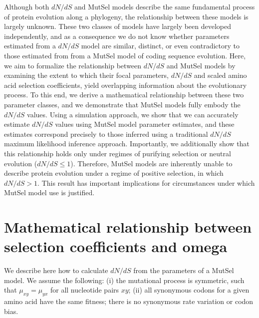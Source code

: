 \documentclass[11pt]{article}
\begin{document}
Although both $dN/dS$ and MutSel models describe the same fundamental process of protein evolution along a phylogeny, the relationship between these models is largely unknown. These two classes of models have largely been developed independently, and as a consequence we do not know whether parameters estimated from a $dN/dS$ model are similar, distinct, or even contradictory to those estimated from from a MutSel model of coding sequence evolution. Here, we aim to formalize the relationship between $dN/dS$ and MutSel models by examining the extent to which their focal parameters, $dN/dS$ and scaled amino acid selection coefficients, yield overlapping information about the evolutionary process. To this end, we derive a mathematical relationship between these two parameter classes, and we demonstrate that MutSel models fully embody the $dN/dS$ values. Using a simulation approach, we show that we can accurately estimate $dN/dS$ values using MutSel model parameter estimates, and these estimates correspond precisely to those inferred using a traditional $dN/dS$ maximum likelihood inference approach.  Importantly, we additionally show that this relationship holds only under regimes of purifying selection or neutral evolution ($dN/dS \leq 1$). Therefore, MutSel models are inherently unable to describe protein evolution under a regime of positive selection, in which $dN/dS > 1$. This result has important implications for circumstances under which MutSel model use is justified.

 
\section*{Mathematical relationship between selection coefficients and omega}
	
We describe here how to calculate $dN/dS$ from the parameters of a MutSel model. We assume the following: (i) the mutational process is symmetric, such that $\mu_{xy}=\mu_{yx}$ for all nucleotide pairs $xy$; (ii) all synonymous codons for a given amino acid have the same fitness; there is no synonymous rate variation or codon bias.
\end{document}
